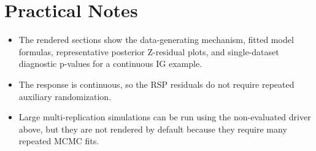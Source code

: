 \documentclass[
  english,
  letterpaper,
  DIV=11,
  numbers=noendperiod]{scrartcl}
\providecommand{\tightlist}{%
  \setlength{\itemsep}{0pt}\setlength{\parskip}{0pt}}
\begin{document}
\section{Practical Notes}\label{practical-notes}

\begin{itemize}
\tightlist
\item
  The rendered sections show the data-generating mechanism, fitted model
  formulas, representative posterior Z-residual plots, and
  single-dataset diagnostic p-values for a continuous IG example.
\item
  The response is continuous, so the RSP residuals do not require
  repeated auxiliary randomization.
\item
  Large multi-replication simulations can be run using the non-evaluated
  driver above, but they are not rendered by default because they
  require many repeated MCMC fits.
\end{itemize}
\end{document}
